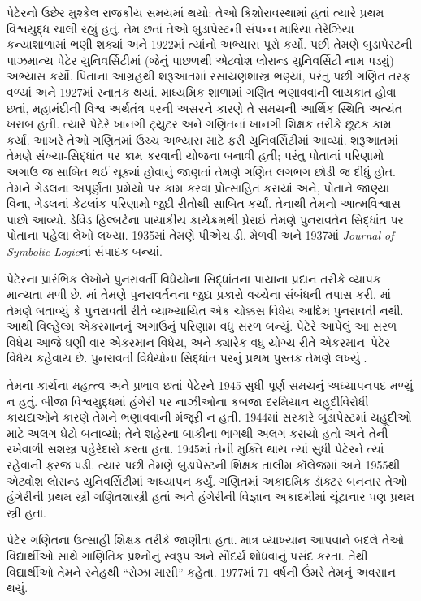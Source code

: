 પેટેરનો ઉછેર મુશ્કેલ રાજકીય સમયમાં
થયો: તેઓ કિશોરાવસ્થામાં હતાં ત્યારે
પ્રથમ વિશ્વયુદ્ધ ચાલી રહ્યું હતું.
તેમ છતાં તેઓ બુડાપેસ્ટની સંપન્ન
મારિયા તેરેઝિયા કન્યાશાળામાં ભણી
શક્યાં અને 1922માં ત્યાંનો અભ્યાસ
પૂરો કર્યો. પછી તેમણે બુડાપેસ્ટની
પાઝમાન્ય પેટેર યુનિવર્સિટીમાં
(જેનું પાછળથી એટ્વોશ લોરાન્ડ
યુનિવર્સિટી નામ પડ્યું) અભ્યાસ
કર્યો. પિતાના આગ્રહથી શરૂઆતમાં
રસાયણશાસ્ત્ર ભણ્યાં, પરંતુ પછી
ગણિત તરફ વળ્યાં અને 1927માં
સ્નાતક થયાં. માધ્યમિક શાળામાં
ગણિત ભણાવવાની લાયકાત હોવા
છતાં, મહામંદીની વિશ્વ અર્થતંત્ર
પરની અસરને કારણે તે સમયની
આર્થિક સ્થિતિ અત્યંત ખરાબ હતી.
ત્યારે પેટેરે ખાનગી ટ્યુટર અને
ગણિતનાં ખાનગી શિક્ષક તરીકે
છૂટક કામ કર્યાં. આખરે તેઓ
ગણિતમાં ઉચ્ચ અભ્યાસ માટે
ફરી યુનિવર્સિટીમાં આવ્યાં.
શરૂઆતમાં તેમણે સંખ્યા-સિદ્ધાંત
પર કામ કરવાની યોજના બનાવી
હતી; પરંતુ પોતાનાં પરિણામો
અગાઉ જ સાબિત થઈ ચૂક્યાં
હોવાનું જાણતાં તેમણે ગણિત
લગભગ છોડી જ દીધું હોત.
તેમને ગેડલના અપૂર્ણતા
પ્રમેયો પર કામ કરવા પ્રોત્સાહિત
કરાયાં અને, પોતાને જાણ્યા
વિના, ગેડલનાં કેટલાંક પરિણામો
જુદી રીતોથી સાબિત કર્યાં.
તેનાથી તેમનો આત્મવિશ્વાસ
પાછો આવ્યો. ડેવિડ હિલ્બર્ટના
પાયાકીય કાર્યક્રમથી પ્રેરાઈ
તેમણે પુનરાવર્તન સિદ્ધાંત પર
પોતાના પહેલા લેખો લખ્યા.
1935માં તેમણે પીએચ.ડી. મેળવી
અને 1937માં \emph{Journal of
  Symbolic Logic}નાં સંપાદક બન્યાં.

પેટેરના પ્રારંભિક લેખોને
પુનરાવર્તી વિધેયોના સિદ્ધાંતના
પાયાના પ્રદાન તરીકે વ્યાપક
માન્યતા મળી છે.
\cite{Peter1935a}માં તેમણે
પુનરાવર્તનના જુદા પ્રકારો
વચ્ચેના સંબંધની તપાસ કરી.
\cite{Peter1935b}માં તેમણે
બતાવ્યું કે પુનરાવર્તી રીતે
વ્યાખ્યાયિત એક ચોક્કસ વિધેય
આદિમ પુનરાવર્તી નથી. આથી
વિલ્હેલ્મ એકરમાનનું અગાઉનું
પરિણામ વધુ સરળ બન્યું.
પેટેરે આપેલું આ સરળ વિધેય
આજે ઘણી વાર એકરમાન વિધેય,
અને ક્યારેક વધુ યોગ્ય રીતે
એકરમાન--પેટેર વિધેય કહેવાય
છે. પુનરાવર્તી વિધેયોના
સિદ્ધાંત પરનું પ્રથમ પુસ્તક
તેમણે લખ્યું \citep{Peter1951}.

તેમના કાર્યના મહત્ત્વ અને
પ્રભાવ છતાં પેટેરને 1945 સુધી
પૂર્ણ સમયનું અધ્યાપનપદ મળ્યું
ન હતું. બીજા વિશ્વયુદ્ધમાં
હંગેરી પર નાઝીઓના કબજા
દરમિયાન યહૂદીવિરોધી કાયદાઓને
કારણે તેમને ભણાવવાની
મંજૂરી ન હતી. 1944માં સરકારે
બુડાપેસ્ટમાં યહૂદીઓ માટે
અલગ ઘેટો બનાવ્યો; તેને
શહેરના બાકીના ભાગથી
અલગ કરાયો હતો અને તેની
રખેવાળી સશસ્ત્ર પહેરેદારો
કરતા હતા. 1945માં તેની
મુક્તિ થાય ત્યાં સુધી
પેટેરને ત્યાં રહેવાની
ફરજ પડી. ત્યાર પછી
તેમણે બુડાપેસ્ટની શિક્ષક
તાલીમ કૉલેજમાં અને
1955થી એટ્વોશ લોરાન્ડ
યુનિવર્સિટીમાં અધ્યાપન
કર્યું. ગણિતમાં અકાદમિક
ડૉક્ટર બનનાર તેઓ
હંગેરીની પ્રથમ સ્ત્રી
ગણિતશાસ્ત્રી હતાં અને
હંગેરીની વિજ્ઞાન અકાદમીમાં
ચૂંટાનાર પણ પ્રથમ સ્ત્રી હતાં.

પેટેર ગણિતના ઉત્સાહી
શિક્ષક તરીકે જાણીતા હતા.
માત્ર વ્યાખ્યાન આપવાને
બદલે તેઓ વિદ્યાર્થીઓ
સાથે ગાણિતિક પ્રશ્નોનું
સ્વરૂપ અને સૌંદર્ય શોધવાનું
પસંદ કરતા. તેથી વિદ્યાર્થીઓ
તેમને સ્નેહથી “રોઝા માસી”
કહેતા. 1977માં 71 વર્ષની
ઉંમરે તેમનું અવસાન થયું.

